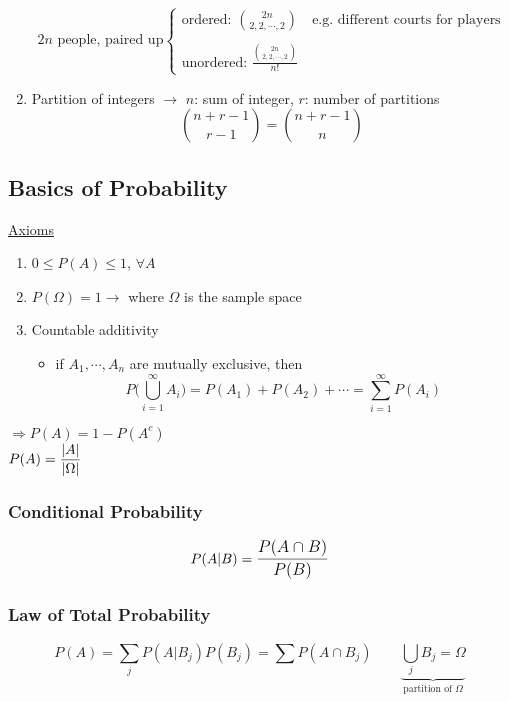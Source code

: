 \begin{enumerate}[label=\protect\circled{\arabic*}]
\begin{equation*}
		2n \text{ people, paired up}
		\begin{cases}
			\text{ordered: } \binom {2n}{2,2,\cdots,2} \quad \text{e.g. different courts for players}\\\\
			\text{unordered: } \frac{\binom {2n}{2,2,\cdots,2}}{n!}
		\end{cases}
	\end{equation*}
	\item Partition of integers $\longrightarrow$ 
	$n$: sum of integer, \quad $r$: number of partitions 
	\begin{equation*}
		 \binom{n + r - 1}{r - 1} = \binom{n + r - 1}{n}
	\end{equation*}
\end{enumerate}
\subsection*{Basics of Probability}
\underline{Axioms}
\begin{enumerate}[label=\protect\circled{\arabic*}]
	\item $0 \leq P(A) \leq 1$, $\forall A$
	\item $P(\Omega) = 1 \rightarrow$ where $\Omega$ is the sample space
	\item Countable additivity
	\begin{itemize}
		\item if $A_1, \cdots, A_n$ are mutually exclusive, then
		\begin{equation*}
			P\bigg(\bigcup\limits_{i=1}^{\infty} A_i\bigg) = P(A_1) + P(A_2) + \cdots = \sum\limits_{i=1}^{\infty} P(A_i)
		\end{equation*}
	\end{itemize}
\end{enumerate}
$\Rightarrow P(A) = 1 - P(A^c)$\\
$P(A) = \mathlarger{\frac{|A|}{|\Omega|}}$
\subsubsection*{Conditional Probability}
\begin{equation*}
	P(A|B) = \mathlarger{\frac{P(A \cap B)}{P(B)}}	
\end{equation*}
\subsubsection*{Law of Total Probability}
\begin{equation*}
	P(A) = \sum\limits_j P(A|B_j) P(B_j) = \sum P(A \cap B_j) \quad \quad \underbrace{\bigcup\limits_j B_j = \Omega}_{\text{partition of $\Omega$}}
\end{equation*}
